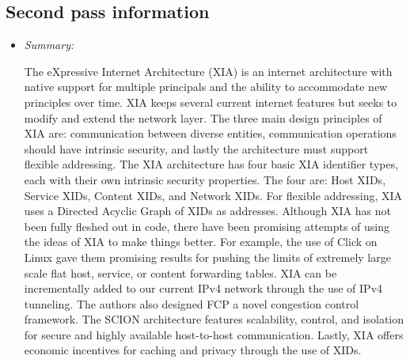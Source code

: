 \documentclass[letterpaper,twocolumn,10pt]{article}
\begin{document}
\subsection{Second pass information}
\label{sec:second}
\begin{itemize}
\item {\it Summary:} 

The eXpressive Internet Architecture (XIA) is an internet architecture with native support for multiple principals
and the ability to accommodate new principles over time. XIA keeps several current internet features but seeks
to modify and extend the network layer. The three main design principles of XIA are: communication between 
diverse entities, communication operations should have intrinsic security, and lastly the architecture must 
support flexible addressing. The XIA architecture has four basic XIA identifier types, each with their own 
intrinsic security properties. The four are: Host XIDs, Service XIDs, Content XIDs, and Network XIDs. For 
flexible addressing, XIA uses a Directed Acyclic Graph of XIDs as addresses. Although XIA has not been 
fully fleshed out in code, there have been promising attempts of using the ideas of XIA to make things
better. For example, the use of Click on Linux gave them promising results for pushing the limits of 
extremely large scale flat host, service, or content forwarding tables. XIA can be incrementally added to
our current IPv4 network through the use of IPv4 tunneling. The authors also designed FCP a novel
congestion control framework. The SCION architecture features scalability, control, and isolation for secure
and highly available host-to-host communication. Lastly, XIA offers economic incentives for caching and 
privacy through the use of XIDs. 

\end{itemize}
\end{document}
